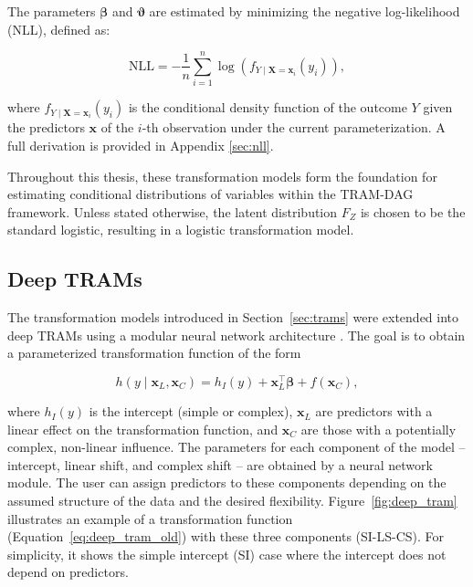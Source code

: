 The parameters $\boldsymbol{\beta}$ and $\boldsymbol{\vartheta}$ are estimated by minimizing the negative log-likelihood (NLL), defined as:


\begin{equation}
\text{NLL} = - \frac{1}{n} \sum_{i=1}^{n} \log \left(f_{Y \mid \mathbf{X} = \mathbf{x}_i}(y_i)\right),
\label{eq:nll_tram}
\end{equation}

where $f_{Y \mid \mathbf{X} = \mathbf{x}_i}(y_i)$ is the conditional density function of the outcome $Y$ given the predictors $\mathbf{x}$ of the $i$-th observation under the current parameterization. A full derivation is provided in Appendix \ref{sec:nll}.

Throughout this thesis, these transformation models form the foundation for estimating conditional distributions of variables within the TRAM-DAG framework. Unless stated otherwise, the latent distribution $F_Z$ is chosen to be the standard logistic, resulting in a logistic transformation model.



\subsection{Deep TRAMs} \label{sec:deep_trams}

The transformation models introduced in Section~\ref{sec:trams} were extended into deep TRAMs using a modular neural network architecture \citep{sick2020}. The goal is to obtain a parameterized transformation function of the form

\begin{equation}
h(y \mid \mathbf{x}_L, \mathbf{x}_C ) = h_I(y) + \mathbf{x}_L^\top \boldsymbol{\beta} + f(\mathbf{x}_C),
\label{eq:deep_tram_old}
\end{equation}

where $h_I(y)$ is the intercept (simple or complex), $\mathbf{x}_{L}$ are predictors with a linear effect on the transformation function, and $\mathbf{x}_{C}$ are those with a potentially complex, non-linear influence. The parameters for each component of the model -- intercept, linear shift, and complex shift -- are obtained by a neural network module. The user can assign predictors to these components depending on the assumed structure of the data and the desired flexibility. Figure~\ref{fig:deep_tram} illustrates an example of a transformation function (Equation~\ref{eq:deep_tram_old}) with these three components (SI-LS-CS). For simplicity, it shows the simple intercept (SI) case where the intercept does not depend on predictors.


